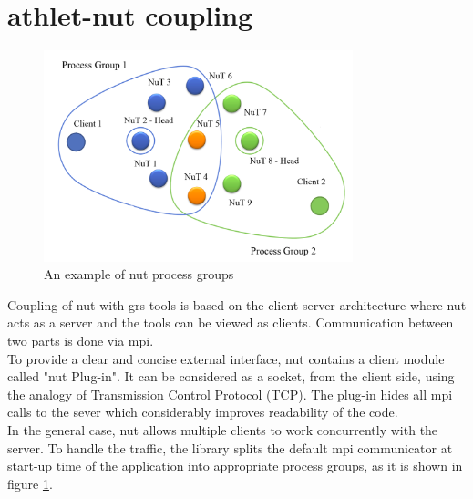\section{\acrshort{athlet}-\acrshort{nut} coupling}
\label{sec:athlet-nut-coupling}

\figpointer{\ref{fig:introduction-nut-process-groups}}
\begin{figure}[htpb]
  \centering
  \includegraphics[width=0.8\textwidth]{figures/introduction-nut-process-groups.png}
\caption{An example of \acrshort{nut} process groups}
\label{fig:introduction-nut-process-groups}
\end{figure}

Coupling of \acrshort{nut} with \acrshort{grs} tools is based on the client-server architecture where \acrshort{nut} acts as a server and the tools can be viewed as clients. Communication between two parts is done via \acrshort{mpi}.\\


To provide a clear and concise external interface, \acrshort{nut} contains a client module called "\acrshort{nut} Plug-in". It can be  considered as a socket, from the client side, using the analogy of Transmission Control Protocol (TCP). The plug-in hides all \acrshort{mpi} calls to the sever which considerably improves readability of the code.\\


In the general case, \acrshort{nut} allows multiple clients to work concurrently with the server. To handle the traffic, the library splits the default \acrshort{mpi} communicator at start-up time of the application into appropriate process groups, as it is shown in figure \ref{fig:introduction-nut-process-groups}.\\



